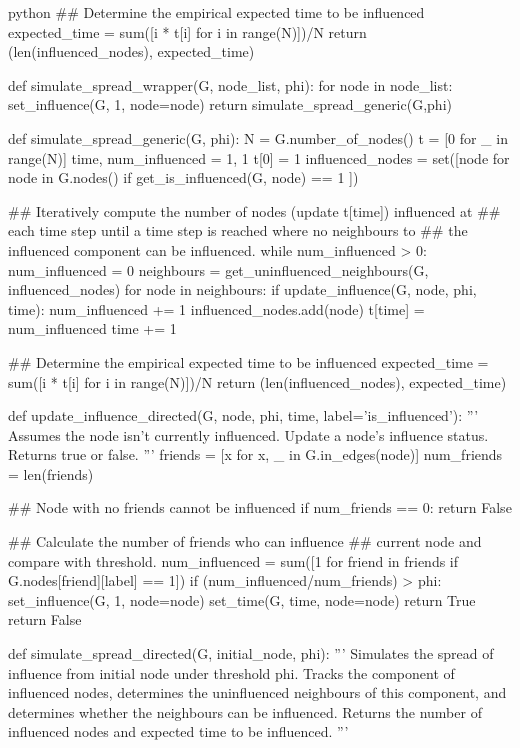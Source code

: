 \documentclass[10pt, oneside, reqno]{amsart}
\theoremstyle{plain}%
\theoremstyle{definition}
\theoremstyle{remark}
\begin{document}
\begin{mintedbox}{python}
    ## Determine the empirical expected time to be influenced
    expected_time = sum([i * t[i] for i in range(N)])/N
    return (len(influenced_nodes), expected_time)


def simulate_spread_wrapper(G, node_list, phi):
    for node in node_list:
        set_influence(G, 1, node=node)
    return simulate_spread_generic(G,phi)

def simulate_spread_generic(G, phi):
    N = G.number_of_nodes()
    t = [0 for _ in range(N)]
    time, num_influenced = 1, 1
    t[0] = 1
    influenced_nodes = set([node for node in G.nodes() if get_is_influenced(G, node) == 1 ])
    
    ## Iteratively compute the number of nodes (update t[time]) influenced at
    ## each time step until a time step is reached where no neighbours to
    ## the influenced component can be influenced.
    while num_influenced > 0:
        num_influenced = 0
        neighbours = get_uninfluenced_neighbours(G, influenced_nodes)
        for node in neighbours:
            if update_influence(G, node, phi, time):
                num_influenced += 1
                influenced_nodes.add(node)
        t[time] = num_influenced
        time += 1
    
    ## Determine the empirical expected time to be influenced
    expected_time = sum([i * t[i] for i in range(N)])/N
    return (len(influenced_nodes), expected_time)

def update_influence_directed(G, node, phi, time, label='is_influenced'):
    '''
        Assumes the node isn't currently influenced.
        Update a node's influence status.
        Returns true or false.
    '''
    friends = [x for x, _ in G.in_edges(node)]
    num_friends = len(friends)

    ## Node with no friends cannot be influenced
    if num_friends == 0:
        return False

    ## Calculate the number of friends who can influence 
    ## current node and compare with threshold.
    num_influenced = sum([1 for friend in friends if G.nodes[friend][label] == 1])
    if (num_influenced/num_friends) > phi:
        set_influence(G, 1, node=node)
        set_time(G, time, node=node)
        return True
    return False
    
def simulate_spread_directed(G, initial_node, phi):
    '''
        Simulates the spread of influence from initial node under threshold phi.
        Tracks the component of influenced nodes, determines the uninfluenced 
        neighbours of this component, and determines whether the neighbours 
        can be influenced. 
        Returns the number of influenced nodes and expected time to be influenced.
    '''
    

\end{mintedbox}
\end{document}
